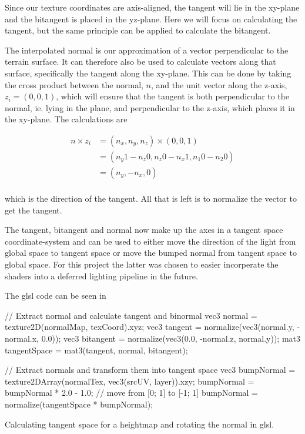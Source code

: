 Since our texture coordinates are axis-aligned, the tangent will lie
in the xy-plane and the bitangent is placed in the yz-plane. Here we
will focus on calculating the tangent, but the same principle can be
applied to calculate the bitangent.

The interpolated normal is our approximation of a vector perpendicular
to the terrain surface. It can therefore also be used to calculate
vectors along that surface, specifically the tangent along the
xy-plane. This can be done by taking the cross product between the
normal, $n$, and the unit vector along the z-axis, $z_i = (0,0,1)$, which
will ensure that the tangent is both perpendicular to the normal, ie.
lying in the plane, and perpendicular to the z-axis, which places it
in the xy-plane. The calculations are

\begin{displaymath}
  \begin{array}{rl}
  n \times z_i &= (n_x, n_y, n_z) \times (0,0,1)\\
  &= (n_y 1 - n_z 0, n_z 0 - n_x 1, n_1 0 - n_2 0) \\
  &= (n_y, - n_x, 0) \\
  \end{array}
\end{displaymath}

which is the direction of the tangent. All that is left is to
normalize the vector to get the tangent.

The tangent, bitangent and normal now make up the axes in a tangent
space coordinate-system and can be used to either move the direction
of the light from global space to tangent space or move the bumped
normal from tangent space to global space. For this project the latter
was chosen to easier incorperate the shaders into a deferred lighting
pipeline in the future.

The glsl code can be seen in 

\begin{listing}
\label{lst:bumpmapping}
\centering
\begin{cppcode}
  // Extract normal and calculate tangent and binormal
  vec3 normal = texture2D(normalMap, texCoord).xyz;
  vec3 tangent = normalize(vec3(normal.y, -normal.x, 0.0));
  vec3 bitangent = normalize(vec3(0.0, -normal.z, normal.y));
  mat3 tangentSpace = mat3(tangent, normal, bitangent);

  // Extract normals and transform them into tangent space
  vec3 bumpNormal = texture2DArray(normalTex, vec3(srcUV, layer)).xzy;
  bumpNormal = bumpNormal * 2.0 - 1.0; // move from [0; 1] to [-1; 1]
  bumpNormal = normalize(tangentSpace * bumpNormal);
\end{cppcode}
\caption{Calculating tangent space for a heightmap and rotating the normal in glsl.}
\end{listing}


